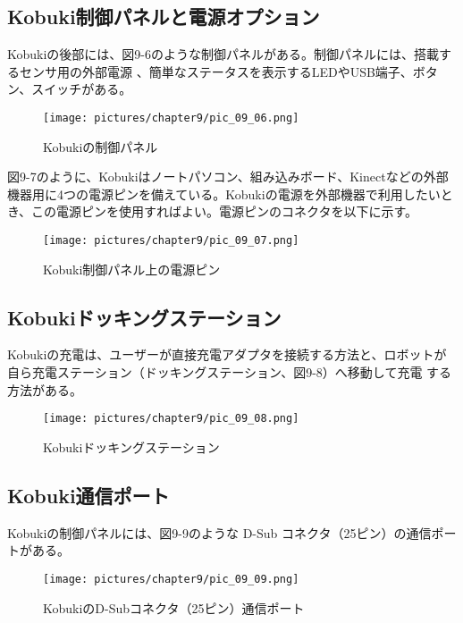 \subsection{Kobuki制御パネルと電源オプション}

Kobukiの後部には、図9-6のような制御パネルがある。制御パネルには、搭載するセンサ用の外部電源  、簡単なステータスを表示するLEDやUSB端子、ボタン、スイッチがある。

\begin{figure}[htp]
  \centering
  \texttt{[image: pictures/chapter9/pic\_09\_06.png]}
  \caption{Kobukiの制御パネル}
\end{figure}

図9-7のように、Kobukiはノートパソコン、組み込みボード、Kinectなどの外部機器用に4つの電源ピンを備えている。Kobukiの電源を外部機器で利用したいとき、この電源ピンを使用すればよい。電源ピンのコネクタを以下に示す。

\begin{figure}[htp]
  \centering
  \texttt{[image: pictures/chapter9/pic\_09\_07.png]}
  \caption{Kobuki制御パネル上の電源ピン}
\end{figure}

\subsection{Kobukiドッキングステーション}

Kobukiの充電は、ユーザーが直接充電アダプタを接続する方法と、ロボットが自ら充電ステーション（ドッキングステーション、図9-8）へ移動して充電  する方法がある。

\begin{figure}[htp]
  \centering
  \texttt{[image: pictures/chapter9/pic\_09\_08.png]}
  \caption{Kobukiドッキングステーション}
\end{figure}

\subsection{Kobuki通信ポート}

Kobukiの制御パネルには、図9-9のような D-Sub コネクタ（25ピン）の通信ポートがある。

\begin{figure}[htp]
  \centering
  \texttt{[image: pictures/chapter9/pic\_09\_09.png]}
  \caption{KobukiのD-Subコネクタ（25ピン）通信ポート}
\end{figure}

